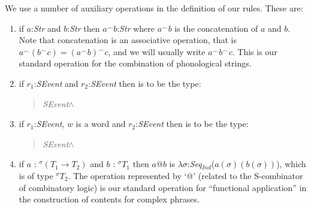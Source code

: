 We use a number of auxiliary operations in the definition of our
rules.  These are:
\begin{enumerate}

\renewcommand{\labelenumi}{Op\arabic{enumi}.} 
 
\item if $a$:\textit{Str} and $b$:\textit{Str} then $a^\frown
  b$:\textit{Str} where $a^\frown b$ is the concatenation of $a$ and
  $b$. Note that concatenation is an associative operation, that is
  $a^\frown(b^\frown c) = (a^\frown b)^\frown c$, and we will usually
  write $a^\frown b^\frown c$.  This is our standard operation for the
  combination of phonological strings.



\item if $r_1$:\textit{SEvent} and $r_2$:\textit{SEvent} then
   is to be the type:
\begin{quote}
\textit{SEvent}\d{$\wedge$}
\end{quote}

\item if $r_1$:\textit{SEvent}, $w$ is a word and $r_2$:\textit{SEvent} then
   is to be the type:
\begin{quote}
\textit{SEvent}\d{$\wedge$}
\end{quote}

\item if $a$ : $^\sigma(T_1\rightarrow T_2)$ and $b$ : $^\sigma T_1$ then
  $a@b$ is
  $\lambda\sigma$:\textit{Seq$_{\mathit{Ind}}$}($a(\sigma)(b(\sigma))$),
  which is of type $^\sigma T_2$. The operation represented by `@'
  (related to the S-combinator of combinatory logic) is our standard
  operation for ``functional application'' in the construction of
  contents for complex phrases.


\end{enumerate}
